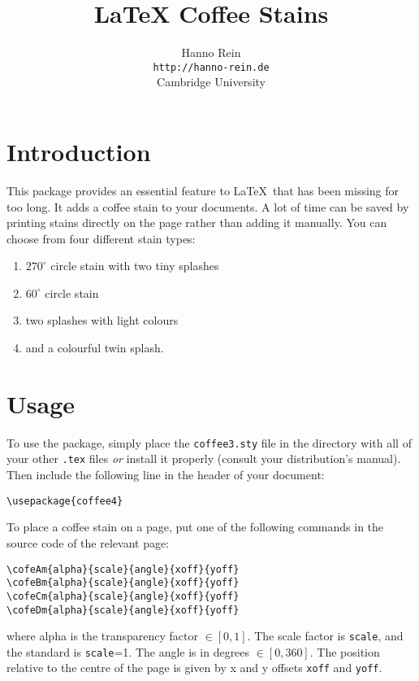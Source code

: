 \documentclass{article}
\begin{document}
\title{LaTeX Coffee Stains}
\author{Hanno Rein\\
\texttt{http://hanno-rein.de}\\
Cambridge University}
\renewcommand{\today}{April 3, 2009}
\maketitle

 
\section{Introduction}
This package provides an essential feature to \LaTeX~that has been missing for too long. It adds a coffee stain to your documents. A lot of time can be saved by printing stains directly on the page rather than adding it manually. You can choose from four different stain types:
\begin{enumerate}
  \item $270^\circ$ circle stain with two tiny splashes 
  \item $60^\circ$ circle stain 
  \item two splashes with light colours
  \item and a colourful twin splash.
\end{enumerate}

\section{Usage}
To use the package, simply place the \texttt{coffee3.sty} file in the directory with all of your 
other \texttt{.tex} files \textit{or} install it properly (consult your distribution's manual). 
Then include the following line in the header of your document:
\begin{verbatim}
\usepackage{coffee4}
\end{verbatim}
To place a coffee stain on a page, put one of the following commands in the source code of the relevant page: 
\begin{verbatim}
\cofeAm{alpha}{scale}{angle}{xoff}{yoff}
\cofeBm{alpha}{scale}{angle}{xoff}{yoff}
\cofeCm{alpha}{scale}{angle}{xoff}{yoff}
\cofeDm{alpha}{scale}{angle}{xoff}{yoff}
\end{verbatim}
where alpha is the transparency factor $\in [0,1]$. The scale factor is {\tt scale}, and the standard is {\tt scale}=1. 
The angle is in degrees $\in [0,360]$. 
The position relative to the centre of the page is given by x and y offsets \texttt{xoff} and \texttt{yoff}.
\end{document}
